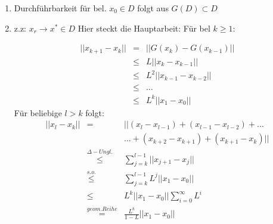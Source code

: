 \documentclass[10pt,a4paper]{article}
\begin{document}
\begin{enumerate}
\item Durchführbarkeit für bel. $x_0 \in D$ folgt aus $G(D) \subset D$
\item z.z: $x_r \rightarrow x^{*} \in D$ Hier steckt die Hauptarbeit: Für bel $k \geq 1:$ 

\begin{eqnarray*}
||x_{k+1}-x_k||&=&||G(x_k)-G(x_{k-1})|| \\
&\leq & L||x_k - x_{k-1}|| \\
&\leq & L^{2}||x_{k-1} - x_{k-2}|| \\
&\leq & \ldots \\
&\leq & L^{k}||x_{1} - x_{0}||
\end{eqnarray*}
Für beliebige $l > k$ folgt:
\begin{eqnarray*}
||x_l-x_k||&=&||(x_l-x_{l-1})+(x_{l-1}-x_{l-2})+\ldots \\
& & \ldots + (x_{k+2}-x_{k+1})+(x_{k+1}-x_k)|| \\
&\stackrel{\Delta-Ungl.}{\leq}& \sum_{j=k}^{l-1}||x_{j+1}-x_{j}|| \\
&\stackrel{s.o.}{\leq}& \sum_{j=k}^{l-1} L^{j} ||x_1 - x_0|| \\
&\leq & L^{k} ||x_1-x_0|| \sum_{i=0}^{\infty}L^{i} \\
&\stackrel{geom. Reihe}{=} & \frac{L^{k}}{1-L} ||x_1-x_0||
\end{eqnarray*}



\end{enumerate}
\end{document}
